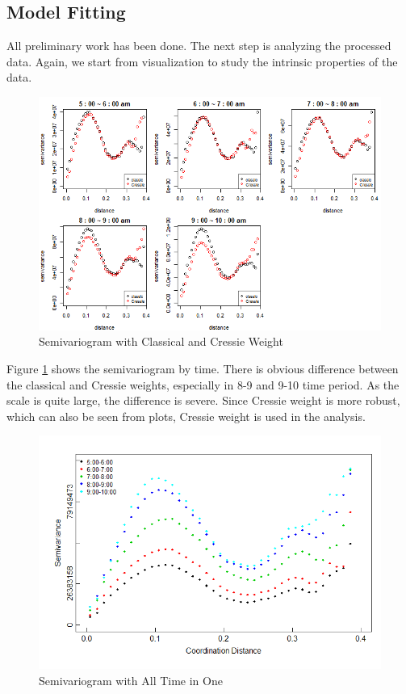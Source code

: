 \documentclass[hidelinks,12pt]{article}
\begin{document}
	\subsection{Model Fitting} \label{sec:resfit}
	All preliminary work has been done. The next step is analyzing the processed data. Again, we start from visualization to study the intrinsic properties of the data.
	\begin{figure}[!ht]
		\includegraphics[width=\textwidth]{semi.png}
		\caption{Semivariogram with Classical and Cressie Weight \label{fig:semi}}
	\end{figure}
	Figure \ref{fig:semi} shows the semivariogram by time. There is obvious difference between the classical and Cressie weights, especially in 8-9 and 9-10 time period. As the scale is quite large, the difference is severe. Since Cressie weight is more robust, which can also be seen from plots, Cressie weight is used in the analysis.
	\begin{figure}[!ht]
		\includegraphics[width=\textwidth]{semi_full.png}
		\caption{Semivariogram with All Time in One \label{fig:semi_one}}
	\end{figure}
\end{document}
